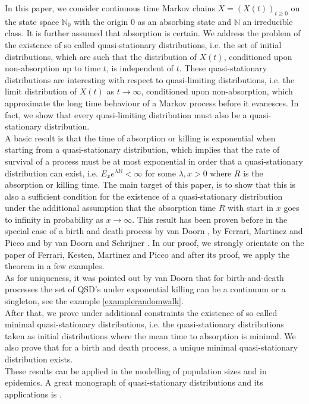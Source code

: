\documentclass[12pt,a4paper]{scrartcl}
\numberwithin{equation}{section}
\newcommand{\N}{\mathbb{N}} %
\begin{document}
In this paper, we consider continuous time Markov chains $X= \left( X\left(t\right) \right)_{t \geq 0}$ on the state space $\N_0$ with the origin $0$ as an absorbing state and $\N$ an irreducible class. It is further assumed that absorption is certain. We address the problem of the existence of so called quasi-stationary distributions, i.e. the set of initial distributions, which are such that the distribution of $X\left(t\right)$, conditioned upon non-absorption up to time $t$, is independent of $t$. These quasi-stationary distributions are interesting with respect to quasi-limiting distributions, i.e. the limit distribution of $X\left(t\right)$ as $t \to \infty$, conditioned upon non-absorption, which approximate the long time behaviour of a Markov process before it evanesces. In fact, we show that every quasi-limiting distribution must also be a quasi-stationary distribution.\\ 
A basic result is that the time of absorption or killing is exponential when starting from a quasi-stationary distribution, which implies that the rate of survival of a process must be at most exponential in order that a quasi-stationary distribution can exist, i.e. $E_x e^{\lambda R} < \infty$ for some $ \lambda, x > 0$ where $R$ is the absorption or killing time. The main target of this paper, is to show that this is also a sufficient condition for the existence of a quasi-stationary distribution under the additional assumption that the absorption time $R$ with start in $x$ goes to infinity in probability as $x \to \infty$. This result has been proven before in the special case of a birth and death process by van Doorn \cite{vanDoorn}, by Ferrari, Martinez and Picco \cite{ferraripiccobirthdeath} and by van Doorn and Schrijner \cite{schriejner}. In our proof, we strongly orientate on the paper of Ferrari, Kesten, Martinez and Picco \cite{ferrari} and after its proof, we apply the theorem in a few examples. \\
As for uniqueness, it was pointed out by van Doorn \cite{vanDoorn} that for birth-and-death processes the set of QSD's under exponential killing can be a continuum or a singleton, see the example \ref{examplerandomwalk}. \\
After that, we prove under additional constraints the existence of so called minimal quasi-stationary distributions, i.e. the quasi-stationary distributions taken as initial distributions where the mean time to absorption is minimal. We also prove that for a birth and death process, a unique minimal quasi-stationary distribution exists.\\[1em]
These results can be applied in the modelling of population sizes and in epidemics. A great monograph of quasi-stationary distributions and its applications is \cite{bookMartinez}.\\[2ex]
\end{document}
